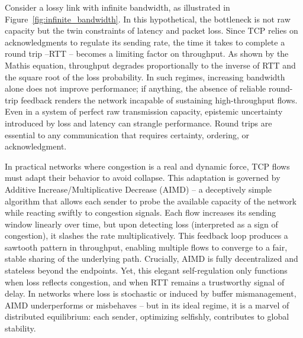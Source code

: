 \documentclass[../OAE-SPEC-MAIN.tex]{subfiles}
\begin{document}

Consider a lossy link with infinite bandwidth, as illustrated in Figure~\ref{fig:infinite_bandwidth}. In this hypothetical, the bottleneck is not raw capacity but the twin constraints of latency and packet loss. Since TCP relies on acknowledgments to regulate its sending rate, the time it takes to complete a round trip --RTT -- becomes a limiting factor on throughput. As shown by the Mathis equation\cite{mathis1997}, throughput degrades proportionally to the inverse of RTT and the square root of the loss probability. In such regimes, increasing bandwidth alone does not improve performance; if anything, the absence of reliable round-trip feedback renders the network incapable of sustaining high-throughput flows. Even in a system of perfect raw transmission capacity, epistemic uncertainty introduced by loss and latency can strangle performance. Round trips are essential to any communication that requires certainty, ordering, or acknowledgment.

In practical networks where congestion is a real and dynamic force, TCP flows must adapt their behavior to avoid collapse. This adaptation is governed by Additive Increase/Multiplicative Decrease (AIMD) -- a deceptively simple algorithm that allows each sender to probe the available capacity of the network while reacting swiftly to congestion signals. Each flow increases its sending window linearly over time, but upon detecting loss (interpreted as a sign of congestion), it slashes the rate multiplicatively. This feedback loop produces a sawtooth pattern in throughput, enabling multiple flows to converge to a fair, stable sharing of the underlying path. Crucially, AIMD is fully decentralized and stateless beyond the endpoints. Yet, this elegant self-regulation only functions when loss reflects congestion, and when RTT remains a trustworthy signal of delay. In networks where loss is stochastic or induced by buffer mismanagement, AIMD underperforms or misbehaves \cite{Gettys2012} -- but in its ideal regime, it is a marvel of distributed equilibrium: each sender, optimizing selfishly, contributes to global stability.
\end{document}
